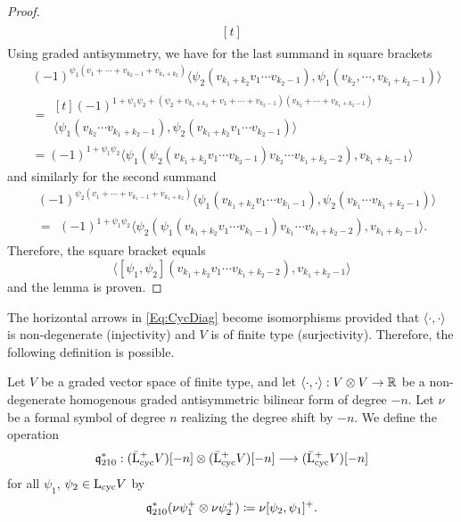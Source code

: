 \documentclass[\MainFolder/Text.tex]{subfiles}
\begin{document}
\begin{proof}
\begin{align*}
\begin{aligned}[t]
\end{aligned}
\end{align*}
Using graded antisymmetry, we have for the last summand in square brackets
\begin{align*}
&(-1)^{\psi_1(v_1+\dotsb+v_{k_2-1} + v_{k_1 + k_2})}\langle \psi_2(v_{k_1+k_2} v_1\dotsb v_{k_2-1}),\psi_1(v_{k_2},\dotsb,v_{k_1+k_2-1})\rangle \\
&= \begin{multlined}[t](-1)^{1 + \psi_1 \psi_2 + (\psi_2 + v_{k_1 + k_2}+v_1+\dotsb+v_{k_2-1})(v_{k_2}+ \dotsb + v_{k_1+k_2-1})} \\ 
\langle \psi_1(v_{k_2}\dotsb v_{k_1+k_2-1}),\psi_2(v_{k_1+k_2} v_1 \dotsb v_{k_2-1})\rangle\end{multlined} \\
& = (-1)^{1+\psi_1 \psi_2}\langle\psi_1(\psi_2(v_{k_1 + k_2} v_1 \dotsb v_{k_2-1}) v_{k_2}\dotsb v_{k_1 + k_2 - 2}),v_{k_1 + k_2 - 1}\rangle
\end{align*}
and similarly for the second summand
\begin{align*}
&(-1)^{\psi_2(v_1+\dotsb+v_{k_1-1} + v_{k_1+k_2})}\langle\psi_1(v_{k_1+k_2}v_1\dotsb v_{k_1-1}),\psi_2(v_{k_1}\dotsb v_{k_1+k_2-1})\rangle\\
&=\begin{multlined}
(-1)^{1+\psi_1 \psi_2} \langle \psi_2(\psi_1(v_{k_1+k_2} v_1 \dotsb v_{k_1-1}) v_{k_1} \dotsb v_{k_1+k_2-2}),v_{k_1 + k_2 - 1}\rangle.
\end{multlined}
\end{align*}
Therefore, the square bracket equals
\[ \langle[\psi_1,\psi_2](v_{k_1+k_2} v_1 \dotsb v_{k_1 + k_2 - 2}), v_{k_1 + k_2 -1} \rangle \]
and the lemma is proven.
\end{proof} 

The horizontal arrows in \eqref{Eq:CycDiag} become isomorphisms provided that $\langle \cdot,\cdot \rangle$ is non-degenerate (injectivity) and $V$ is of finite type (surjectivity). Therefore, the following definition is possible.

\newcommand{\NDeg}{\mathbb{\nu}}
\begin{Definition}\label{Def:NewProduct}
Let $V$ be a graded vector space of finite type, and let $\langle \cdot,\cdot \rangle: V\otimes V \rightarrow \mathbb{R}$ be a non-degenerate homogenous graded antisymmetric bilinear form of degree $-n$. Let $\NDeg$ be a formal symbol of degree $n$ realizing the degree shift by $-n$. We define the operation 
\[ \mathfrak{q}^*_{210}: (\bar{\mathrm{L}}^+_{\mathrm{cyc}} V)[-n] \otimes (\bar{\mathrm{L}}^+_{\mathrm{cyc}} V)[-n] \longrightarrow (\bar{\mathrm{L}}^+_{\mathrm{cyc}} V)[-n] \] 
for all $\psi_1$, $\psi_2 \in \mathrm{L}_{\mathrm{cyc}} V$ by
\[ \OPQ^*_{210}( \NDeg\psi_1^+\otimes \NDeg\psi_2^+) \coloneqq \NDeg[\psi_2,\psi_1]^+. \]
\end{Definition}
\end{document}
